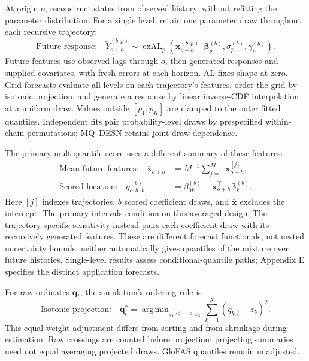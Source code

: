 \documentclass[12pt,letterpaper]{article}
\newcommand{\vect}[1]{\bm{#1}}
\newcommand{\exAL}{\operatorname{exAL}}
\DeclareMathOperator{\argmin}{arg\,min}
\numberwithin{suppalgorithm}{section}
\numberwithin{equation}{section}
\numberwithin{table}{section}
\numberwithin{figure}{section}
\begin{document}
At origin \(o\), reconstruct states from observed history, without
refitting the parameter distribution. For a single level, retain one
parameter draw throughout each recursive trajectory:
\[
\text{Future response:}\quad
\tilde Y_{o+h}^{(b,p)}\sim\exAL_p\!\left(
 \vect x_{o+h}^{(b,p)\top}\vect\beta_p^{(b)},
 \sigma_p^{(b)},\gamma_p^{(b)}\right).
\]
Future features use observed lags through \(o\), then generated responses
and supplied covariates, with fresh errors at each horizon. AL fixes shape
at zero. Grid forecasts evaluate all levels on each trajectory's features,
order the grid by isotonic projection, and generate a response by linear
inverse-CDF interpolation at a uniform draw. Values outside
\([p_1,p_K]\) are clamped to the outer fitted quantiles. Independent fits
pair probability-level draws by prespecified within-chain permutations;
MQ--DESN retains joint-draw dependence.

The primary multiquantile score uses a different summary of these features:
\begin{equation}
\begin{aligned}
\text{Mean future features:}\quad
\bar{\vect x}_{o+h}&=M^{-1}\sum_{j=1}^M
 \tilde{\vect x}_{o+h}^{[j]},\\
\text{Scored location:}\quad
q_{o,h,k}^{(b)}&=\beta_{0k}^{(b)}+
 \bar{\vect x}_{o+h}^\top\vect\beta_k^{(b)}.
\end{aligned}
\label{eq:supp-forecast-mean-design}
\end{equation}
Here \([j]\) indexes trajectories, \(b\) scored coefficient draws, and
\(\bar{\vect x}\) excludes the intercept. The primary intervals condition
on this averaged design. The trajectory-specific sensitivity instead
pairs each coefficient draw with its recursively generated features.
These are different forecast functionals, not nested uncertainty bounds;
neither automatically gives quantiles of the mixture over future
histories. Single-level results assess conditional-quantile paths;
Appendix E specifies the distinct application forecasts.

For raw ordinates \(\widehat{\vect q}_t\), the simulation's ordering rule is
\begin{equation}
\text{Isotonic projection:}\quad
\vect q_t^*=\argmin_{z_1\le\cdots\le z_K}
 \sum_{k=1}^K(\widehat q_{k,t}-z_k)^2.
\label{eq:supp_monotone_projection}
\end{equation}
This equal-weight adjustment differs from sorting
\citep{BarlowBrunk1972IsotonicDual,chernozhukov2010} and from shrinkage
during estimation. Raw crossings are counted before projection;
projecting summaries need not equal averaging projected draws. GloFAS
quantiles remain unadjusted.
\end{document}
